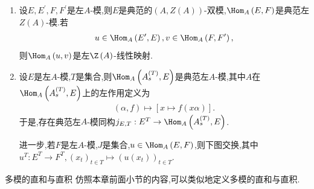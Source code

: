\begin{remark}{}{}
	\begin{enumerate}
		\item 设$E,E^{\prime},F,F^{\prime}$是左$A$-模,则$E$是典范的$\left(A,Z\left(A\right)\right)$-双模,$\Hom_{A}\left(E,F\right)$是典范左$Z\left(A\right)$-模.若
		\begin{align*}
			u\in\Hom_{A}\left(E^{\prime},E\right),v\in\Hom_{A}\left(F,F^{\prime}\right),
		\end{align*}
		则$\Hom_{A}\left(u,v\right)$是左$\Z\left(A\right)$-线性映射.
		\item 设$E$是左$A$-模,$T$是集合,则$\Hom_{A}\left(A_{s}^{\left(T\right)},E\right)$是典范左$A$-模,其中$A$在$\Hom_{A}\left(A_{s}^{\left(T\right)},E\right)$上的左作用定义为
		\begin{align*}
			\left(\alpha,f\right)\mapsto\left[x\mapsto f\left(x\alpha\right)\right].
		\end{align*}
		于是,存在典范左$A$-模同构$j_{E,T}:E^{T}\to\Hom_{A}\left(A_{s}^{\left(T\right)},E\right)$.
		
		进一步,若$F$是左$A$-模,$J$是集合,$u\in\Hom_{A}\left(E,F\right)$,则下图交换,其中$u^{T}:E^{T}\to F^{T},\left(x_{t}\right)_{t\in T}\mapsto\left(u\left(x_{t}\right)\right)_{t\in T}$.
		\begin{center}
		\end{center}
	\end{enumerate}
\end{remark}

\begin{remark}{多模的直和与直积}{}
	仿照本章前面小节的内容,可以类似地定义多模的直和与直积.
\end{remark}






















































